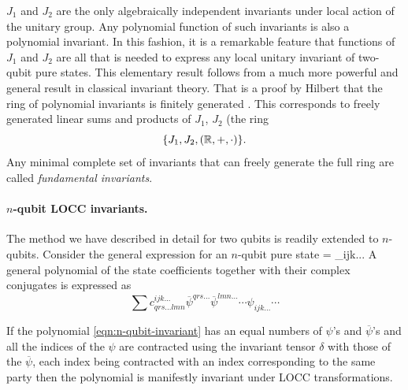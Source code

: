 \begin{remark}
$J_1$ and $J_2$ are the only algebraically independent invariants under local action of the unitary group.
Any polynomial function of such invariants is also a polynomial
invariant.  In this fashion, it is a remarkable feature that functions
of $J_1$ and $J_2$ are all that is needed to express any local unitary
invariant of two-qubit pure states.  This elementary result follows from a
much more powerful and general result in classical invariant theory.
That is a proof by Hilbert that the ring of polynomial invariants is
finitely generated \cite{hilbert}.  This corresponds to freely
generated linear sums and products of $J_1$, $J_2$ (the ring \begin{equation}
    \{J_1, J_2, ({\mathbb R}, +, \cdot)\}. 
\end{equation}
Any minimal complete set of invariants that
can freely generate the full ring are called \emph{fundamental invariants}.
\end{remark}


\paragraph{$n$-qubit LOCC invariants.}

The method we have described in detail for two qubits is readily extended to $n$-qubits.  
Consider the general expression for an $n$-qubit pure state 
\be 
\psi = \sum \psi_{ijk...}
\ee 
A general polynomial of the state coefficients together with their complex conjugates is expressed as
\begin{equation}\label{eqn:n-qubit-invariant}
\sum c^{ijk...}_{qrs...lmn}\overline{\psi}^{qrs...}\overline{\psi}^{lmn...}\cdots\psi_{ijk...}\cdots
\end{equation} 

If the polynomial \eqref{eqn:n-qubit-invariant} has an equal numbers of $\psi$’s 
and $\overline{\psi}$’s and all the indices of the $\psi$ are contracted using the
invariant tensor $\delta$ with those of the $\overline{\psi}$, each index being
contracted with an index corresponding to the same party then the polynomial is 
manifestly invariant under LOCC transformations.

